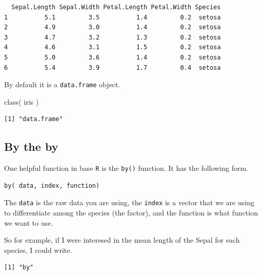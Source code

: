 \documentclass[
  letterpaper,
]{book}
\newenvironment{Shaded}{\begin{snugshade}}{\end{snugshade}}
\newcommand{\FunctionTok}[1]{\textcolor[rgb]{0.28,0.35,0.67}{#1}}
\newcommand{\NormalTok}[1]{\textcolor[rgb]{0.00,0.23,0.31}{#1}}
\newcommand{\OtherTok}[1]{\textcolor[rgb]{0.00,0.23,0.31}{#1}}
\newcommand{\SpecialCharTok}[1]{\textcolor[rgb]{0.37,0.37,0.37}{#1}}
\begin{document}
\begin{verbatim}
  Sepal.Length Sepal.Width Petal.Length Petal.Width Species
1          5.1         3.5          1.4         0.2  setosa
2          4.9         3.0          1.4         0.2  setosa
3          4.7         3.2          1.3         0.2  setosa
4          4.6         3.1          1.5         0.2  setosa
5          5.0         3.6          1.4         0.2  setosa
6          5.4         3.9          1.7         0.4  setosa
\end{verbatim}

By default it is a \texttt{data.frame} object.

\begin{Shaded}
\begin{Highlighting}[]
\FunctionTok{class}\NormalTok{( iris )}
\end{Highlighting}
\end{Shaded}

\begin{verbatim}
[1] "data.frame"
\end{verbatim}

\subsection{By the by}\label{by-the-by}

One helpful function in base \texttt{R} is the \texttt{by()} function.
It has the following form.

\begin{verbatim}
by( data, index, function)
\end{verbatim}

The \texttt{data} is the raw data you are using, the \texttt{index} is a
vector that we are using to differentiate among the species (the
factor), and the function is what function we want to use.

So for example, if I were interesed in the mean length of the Sepal for
each species, I could write.

\begin{Shaded}
\end{Shaded}

\begin{verbatim}
[1] "by"
\end{verbatim}
\end{document}
